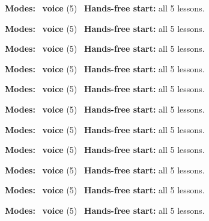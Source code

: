\expandafter\def\csname hlchaptermodality41\endcsname{%
  {\small\noindent
    \textbf{Modes:} \hlvoicesign{}~\textbf{voice} (5)\quad
    \hlvoicesign{}~\textbf{Hands-free start:} all 5 lessons.%
    \par}\medskip
}

\expandafter\def\csname hlchaptermodality42\endcsname{%
  {\small\noindent
    \textbf{Modes:} \hlvoicesign{}~\textbf{voice} (5)\quad
    \hlvoicesign{}~\textbf{Hands-free start:} all 5 lessons.%
    \par}\medskip
}

\expandafter\def\csname hlchaptermodality43\endcsname{%
  {\small\noindent
    \textbf{Modes:} \hlvoicesign{}~\textbf{voice} (5)\quad
    \hlvoicesign{}~\textbf{Hands-free start:} all 5 lessons.%
    \par}\medskip
}

\expandafter\def\csname hlchaptermodality44\endcsname{%
  {\small\noindent
    \textbf{Modes:} \hlvoicesign{}~\textbf{voice} (5)\quad
    \hlvoicesign{}~\textbf{Hands-free start:} all 5 lessons.%
    \par}\medskip
}

\expandafter\def\csname hlchaptermodality45\endcsname{%
  {\small\noindent
    \textbf{Modes:} \hlvoicesign{}~\textbf{voice} (5)\quad
    \hlvoicesign{}~\textbf{Hands-free start:} all 5 lessons.%
    \par}\medskip
}

\expandafter\def\csname hlchaptermodality46\endcsname{%
  {\small\noindent
    \textbf{Modes:} \hlvoicesign{}~\textbf{voice} (5)\quad
    \hlvoicesign{}~\textbf{Hands-free start:} all 5 lessons.%
    \par}\medskip
}

\expandafter\def\csname hlchaptermodality47\endcsname{%
  {\small\noindent
    \textbf{Modes:} \hlvoicesign{}~\textbf{voice} (5)\quad
    \hlvoicesign{}~\textbf{Hands-free start:} all 5 lessons.%
    \par}\medskip
}

\expandafter\def\csname hlchaptermodality48\endcsname{%
  {\small\noindent
    \textbf{Modes:} \hlvoicesign{}~\textbf{voice} (5)\quad
    \hlvoicesign{}~\textbf{Hands-free start:} all 5 lessons.%
    \par}\medskip
}

\expandafter\def\csname hlchaptermodality49\endcsname{%
  {\small\noindent
    \textbf{Modes:} \hlvoicesign{}~\textbf{voice} (5)\quad
    \hlvoicesign{}~\textbf{Hands-free start:} all 5 lessons.%
    \par}\medskip
}

\expandafter\def\csname hlchaptermodality50\endcsname{%
  {\small\noindent
    \textbf{Modes:} \hlvoicesign{}~\textbf{voice} (5)\quad
    \hlvoicesign{}~\textbf{Hands-free start:} all 5 lessons.%
    \par}\medskip
}

\expandafter\def\csname hlchaptermodality51\endcsname{%
  {\small\noindent
    \textbf{Modes:} \hlvoicesign{}~\textbf{voice} (5)\quad
    \hlvoicesign{}~\textbf{Hands-free start:} all 5 lessons.%
    \par}\medskip
}
